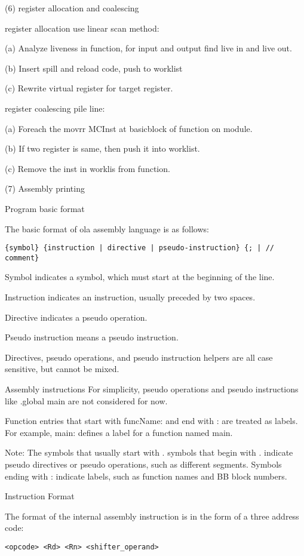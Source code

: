 \begin{itemize}
(6) register allocation and coalescing

register allocation use linear scan method:\par
(a) Analyze liveness in function, for input and output find live in and live out.\par
(b) Insert spill and reload code, push to worklist\par
(c) Rewrite virtual register for target register.

register coalescing pile line:

(a) Foreach the movrr MCInst at basicblock of function on module.\par
(b) If two register is same, then push it into worklist.\par
(c) Remove the inst in worklis from function.\par

(7) Assembly printing

Program basic format\par
The basic format of ola assembly language is as follows:
\begin{lstlisting}[language={}]
{symbol} {instruction | directive | pseudo-instruction} {; | // comment}
\end{lstlisting}

Symbol indicates a symbol, which must start at the beginning of the line.\par
Instruction indicates an instruction, usually preceded by two spaces.\par
Directive indicates a pseudo operation.\par
Pseudo instruction means a pseudo instruction.\par
Directives, pseudo operations, and pseudo instruction helpers are all case sensitive, but cannot be mixed.

Assembly instructions
For simplicity, pseudo operations and pseudo instructions like .global main are not considered for now.\par

Function entries that start with funcName: and end with : are treated as labels. For example, main: defines a label for a function named main.

Note: The symbols that usually start with . symbols that begin with . indicate pseudo directives or pseudo operations, such as different segments. Symbols ending with : indicate labels, such as function names and BB block numbers.

Instruction Format\par
The format of the internal assembly instruction is in the form of a three address code:
\begin{lstlisting}[language={}]
    <opcode> <Rd> <Rn> <shifter_operand>
\end{lstlisting}


\end{itemize}
